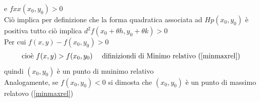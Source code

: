 \begin{defi}
\begin{equation*}
         \end{equation*}
         e $fxx(x_0,y_0)>0$\\
         Ciò implica per definizione che la forma quadratica associata ad $Hp(x_0,y_0)$ è positiva
         tutto ciò implica $d^2f(x_0+\theta h, y_0+\theta k)>0$\\
         Per cui $f(x,y)-f(x_0,y_0)>0$ 
         \begin{equation*}
           \begin{matrix}
              \text{cioè } f(x,y)>f(x_0,y_0) & \text{ difiniziondi di Minimo relativo (\ref{minmaxrel})}
           \end{matrix}
         \end{equation*}
         quindi $(x_0,y_0)$ è un punto di muinimo relativo\\
         Analogamente, se $f(x_0,y_0)<0$ si dimosta che $(x_0,y_0)$ è un punto di massimo
         relatovo (\ref{minmaxrel})
\end{defi}
\clearpage
